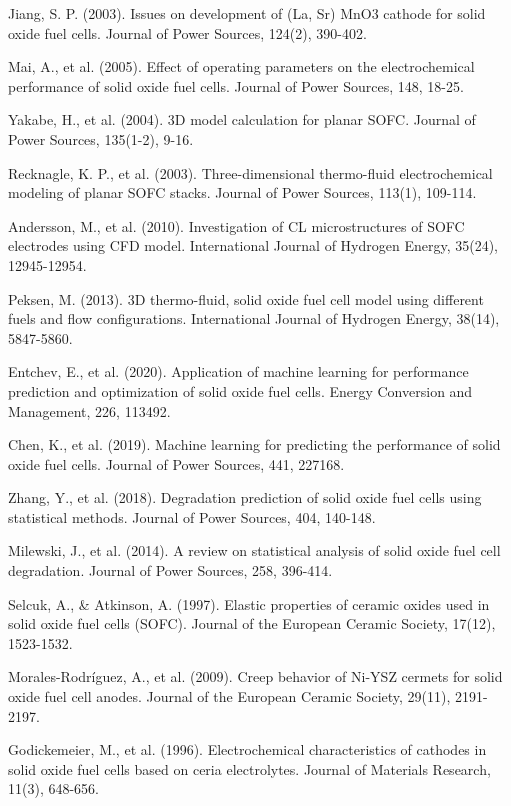 \documentclass[10pt,conference]{IEEEtran}
\begin{document}
\begin{thebibliography}{99}
 Jiang, S. P. (2003). Issues on development of (La, Sr) MnO3 cathode for solid oxide fuel cells. Journal of Power Sources, 124(2), 390-402.

 Mai, A., et al. (2005). Effect of operating parameters on the electrochemical performance of solid oxide fuel cells. Journal of Power Sources, 148, 18-25.

 Yakabe, H., et al. (2004). 3D model calculation for planar SOFC. Journal of Power Sources, 135(1-2), 9-16.

 Recknagle, K. P., et al. (2003). Three-dimensional thermo-fluid electrochemical modeling of planar SOFC stacks. Journal of Power Sources, 113(1), 109-114.

 Andersson, M., et al. (2010). Investigation of CL microstructures of SOFC electrodes using CFD model. International Journal of Hydrogen Energy, 35(24), 12945-12954.

 Peksen, M. (2013). 3D thermo-fluid, solid oxide fuel cell model using different fuels and flow configurations. International Journal of Hydrogen Energy, 38(14), 5847-5860.

 Entchev, E., et al. (2020). Application of machine learning for performance prediction and optimization of solid oxide fuel cells. Energy Conversion and Management, 226, 113492.

 Chen, K., et al. (2019). Machine learning for predicting the performance of solid oxide fuel cells. Journal of Power Sources, 441, 227168.

 Zhang, Y., et al. (2018). Degradation prediction of solid oxide fuel cells using statistical methods. Journal of Power Sources, 404, 140-148.

 Milewski, J., et al. (2014). A review on statistical analysis of solid oxide fuel cell degradation. Journal of Power Sources, 258, 396-414.

 Selcuk, A., \& Atkinson, A. (1997). Elastic properties of ceramic oxides used in solid oxide fuel cells (SOFC). Journal of the European Ceramic Society, 17(12), 1523-1532.

 Morales-Rodríguez, A., et al. (2009). Creep behavior of Ni-YSZ cermets for solid oxide fuel cell anodes. Journal of the European Ceramic Society, 29(11), 2191-2197.

 Godickemeier, M., et al. (1996). Electrochemical characteristics of cathodes in solid oxide fuel cells based on ceria electrolytes. Journal of Materials Research, 11(3), 648-656.


\end{thebibliography}
\end{document}
